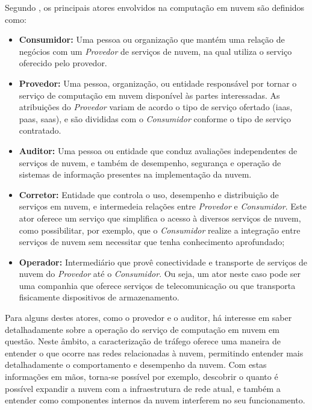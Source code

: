 Segundo \cite{nist:modeloreferencia}, os principais atores envolvidos na computação em nuvem são definidos como:
\begin{itemize}
\item \textbf{Consumidor:} Uma pessoa ou organização que mantém uma relação de negócios com um \textit{Provedor} de serviços de nuvem, na qual utiliza o serviço oferecido pelo provedor.

\item \textbf{Provedor:} Uma pessoa, organização, ou entidade responsável por tornar o serviço de computação em nuvem disponível às partes interessadas.
%
As atribuições do \textit{Provedor} variam de acordo o tipo de serviço ofertado (\ac{iaas}, \ac{paas}, \ac{saas}), e são divididas com o \textit{Consumidor} conforme o tipo de serviço contratado.

\item \textbf{Auditor:} Uma pessoa ou entidade que conduz avaliações independentes de serviços de nuvem, e também de desempenho, segurança e operação de sistemas de informação presentes na implementação da nuvem.

\item \textbf{Corretor:} Entidade que controla o uso, desempenho e distribuição de serviços em nuvem, e intermedeia relações entre \textit{Provedor} e \textit{Consumidor}.
%
Este ator oferece um serviço que simplifica o acesso à diversos serviços de nuvem, como possibilitar, por exemplo, que o \textit{Consumidor} realize a integração entre serviços de nuvem sem necessitar que tenha conhecimento aprofundado;

\item \textbf{Operador:} Intermediário que provê conectividade e transporte de serviços de nuvem do \textit{Provedor} até o \textit{Consumidor}.
%
Ou seja, um ator neste caso pode ser uma companhia que oferece serviços de telecomunicação ou que transporta fisicamente dispositivos de armazenamento.
\end{itemize}

Para alguns destes atores, como o provedor e o auditor, há interesse em saber detalhadamente sobre a operação do serviço de computação em nuvem em questão.
%
Neste âmbito, a caracterização de tráfego oferece uma maneira de entender o que ocorre nas redes relacionadas à nuvem, permitindo entender mais detalhadamente o comportamento e desempenho da nuvem.
%
Com estas informações em mãos, torna-se possível por exemplo, descobrir o quanto é possível expandir a nuvem com a infraestrutura de rede atual, e também a entender como componentes internos da nuvem interferem no seu funcionamento.



